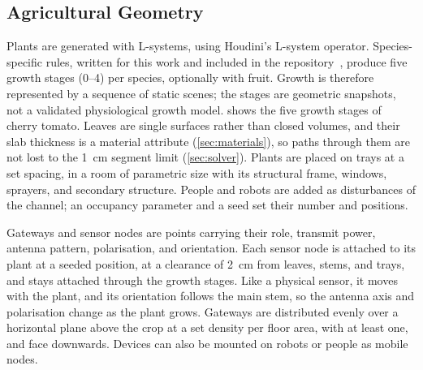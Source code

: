 \subsection{Agricultural Geometry}\label{sec:geometry}
Plants are generated with L-systems, using Houdini's L-system operator. Species-specific rules, written for this work and included in the repository~\cite{housionna}, produce five growth stages (0--4) per species, optionally with fruit. Growth is therefore represented by a sequence of static scenes; the stages are geometric snapshots, not a validated physiological growth model.  shows the five growth stages of cherry tomato. Leaves are single surfaces rather than closed volumes, and their slab thickness is a material attribute (\cref{sec:materials}), so paths through them are not lost to the \SI{1}{cm} segment limit (\cref{sec:solver}). Plants are placed on trays at a set spacing, in a room of parametric size with its structural frame, windows, sprayers, and secondary structure. People and robots are added as disturbances of the channel; an occupancy parameter and a seed set their number and positions.

Gateways and sensor nodes are points carrying their role, transmit power, antenna pattern, polarisation, and orientation. Each sensor node is attached to its plant at a seeded position, at a clearance of \SI{2}{cm} from leaves, stems, and trays, and stays attached through the growth stages. Like a physical sensor, it moves with the plant, and its orientation follows the main stem, so the antenna axis and polarisation change as the plant grows. Gateways are distributed evenly over a horizontal plane above the crop at a set density per floor area, with at least one, and face downwards. Devices can also be mounted on robots or people as mobile nodes.
   



